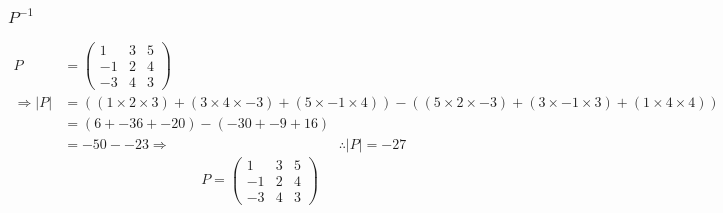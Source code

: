 \documentclass{article}
\begin{document}
\subsubsection{$P^{-1}$}
\begin{align*}
	P &= 
	\begin{pmatrix}
		1 & 3 & 5\\
		-1 & 2 & 4\\
		-3 & 4 & 3
	\end{pmatrix}
	\\
	\Rightarrow
	|P| &= 
	((1\times2\times3)+(3\times4\times-3)+(5\times-1\times4)) - ((5\times2\times-3)+(3\times-1\times3)+(1\times4\times4))
	\\
	&=
	(6+-36+-20)-(-30+-9+16)
	\\
	&=
	-50--23
	\Rightarrow
	\qquad
	\qquad
	\qquad
	\qquad
	\qquad
	\qquad
	\therefore |P| = -27
\end{align*}
\[
P =
	\begin{pmatrix}
		1 & 3 & 5\\
		-1 & 2 & 4\\
		-3 & 4 & 3
	\end{pmatrix}
\]
\end{document}
